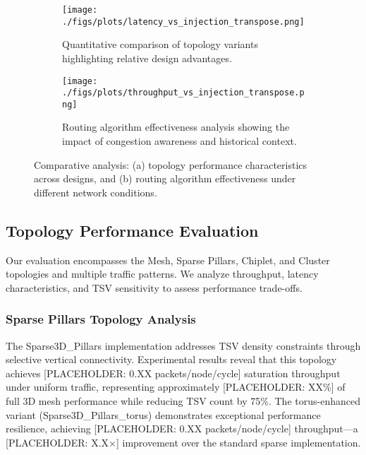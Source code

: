 \documentclass[11pt]{article}
\begin{document}
\begin{figure}[b]
    \centering
    \begin{subfigure}[t]{0.48\linewidth}
        \centering
        \begin{center}
        \texttt{[image: ./figs/plots/latency\_vs\_injection\_transpose.png]}
        \end{center}
        \caption{Quantitative comparison of topology variants highlighting relative design advantages.}
        \label{fig:topology-efficiency-comparison}
    \end{subfigure}\hfill
    \begin{subfigure}[t]{0.48\linewidth}
        \centering
        \begin{center}
        \texttt{[image: ./figs/plots/throughput\_vs\_injection\_transpose.png]}
        \end{center}
        \caption{Routing algorithm effectiveness analysis showing the impact of congestion awareness and historical context.}
        \label{fig:routing-algorithm-comparison}
    \end{subfigure}
    \caption{Comparative analysis: (a) topology performance characteristics across designs, and (b) routing algorithm effectiveness under different network conditions.}
    \label{fig:topology-routing-comparison}
\end{figure}

\subsection{Topology Performance Evaluation}

Our evaluation encompasses the Mesh, Sparse Pillars, Chiplet, and Cluster topologies and multiple traffic patterns. We analyze throughput, latency characteristics, and TSV sensitivity to assess performance trade-offs.

\subsubsection{Sparse Pillars Topology Analysis}

The Sparse3D\_Pillars implementation addresses TSV density constraints through selective vertical connectivity. Experimental results reveal that this topology achieves [PLACEHOLDER: 0.XX packets/node/cycle] saturation throughput under uniform traffic, representing approximately [PLACEHOLDER: XX\%] of full 3D mesh performance while reducing TSV count by 75\%. The torus-enhanced variant (Sparse3D\_Pillars\_torus) demonstrates exceptional performance resilience, achieving [PLACEHOLDER: 0.XX packets/node/cycle] throughput—a [PLACEHOLDER: X.X×] improvement over the standard sparse implementation.
\end{document}

